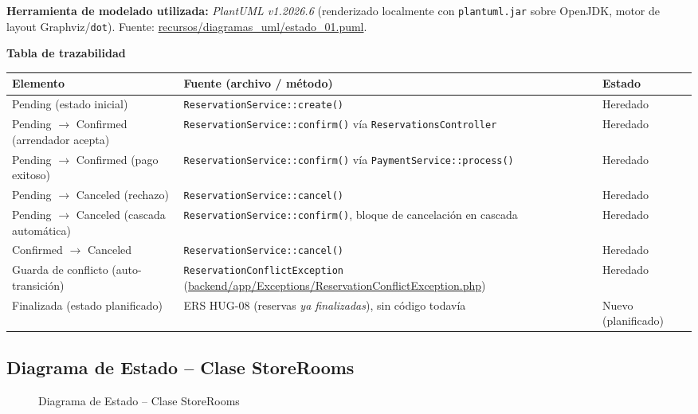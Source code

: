\bigskip
{\sloppy\noindent\textbf{Herramienta de modelado utilizada:} \textit{PlantUML v1.2026.6} (renderizado localmente con \texttt{plantuml.jar} sobre OpenJDK, motor de layout Graphviz/\texttt{dot}). Fuente: \url{recursos/diagramas_uml/estado_01.puml}.\par}

\bigskip
\noindent\textbf{Tabla de trazabilidad}
\begin{longtable}{|L{4cm}|L{7.5cm}|M{2.3cm}|}
\hline
{} \textbf{Elemento} & \textbf{Fuente (archivo / método)} & \textbf{Estado} \\ \hline
\endhead
Pending (estado inicial) & \texttt{ReservationService::create()} & Heredado \\ \hline
Pending $\to$ Confirmed (arrendador acepta) & \texttt{ReservationService::confirm()} vía \texttt{ReservationsController} & Heredado \\ \hline
Pending $\to$ Confirmed (pago exitoso) & \texttt{ReservationService::confirm()} vía \texttt{PaymentService::process()} & Heredado \\ \hline
Pending $\to$ Canceled (rechazo) & \texttt{ReservationService::cancel()} & Heredado \\ \hline
Pending $\to$ Canceled (cascada automática) & \texttt{ReservationService::confirm()}, bloque de cancelación en cascada & Heredado \\ \hline
Confirmed $\to$ Canceled & \texttt{ReservationService::cancel()} & Heredado \\ \hline
Guarda de conflicto (auto-transición) & \texttt{ReservationConflictException} (\url{backend/app/Exceptions/ReservationConflictException.php}) & Heredado \\ \hline
Finalizada (estado planificado) & ERS HUG-08 (reservas \emph{ya finalizadas}), sin código todavía & Nuevo (planificado) \\ \hline
\end{longtable}

\subsection{Diagrama de Estado -- Clase StoreRooms}
\begin{figure}[H]
    \centering
    \caption{Diagrama de Estado -- Clase StoreRooms}
    \label{fig:estado02}
\end{figure}

